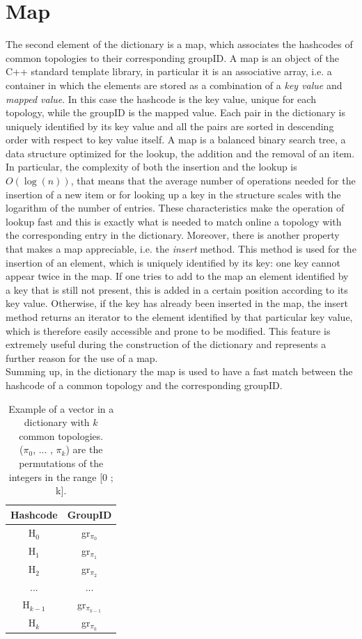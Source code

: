 \section{Map}
The second element of the dictionary is a map, which associates the hashcodes of common topologies to their corresponding groupID. A map is an object of the C++ standard template library, in particular it is an associative array, i.e. a container in which the elements are stored as a combination of a \textit{key value} and \textit{mapped value}. In this case the hashcode is the key value, unique for each topology, while the groupID is the mapped value. Each pair in the dictionary is uniquely identified by its key value and all the pairs are sorted in descending order with respect to key value itself. A map is a balanced binary search tree, a data structure optimized for the lookup, the addition and the removal of an item. In particular, the complexity of both the insertion and the lookup is $O(\log(n))$, that means that the average number of operations needed for the insertion of a new item or for looking up a key in the structure scales with the logarithm of the number of entries. These characteristics make the operation of lookup fast and this is exactly what is needed to match online a topology with the corresponding entry in the dictionary. Moreover, there is another property that makes a map appreciable, i.e. the \textit{insert} method. This method is used for the insertion of an element, which is uniquely identified by its key: one key cannot appear twice in the map. If one tries to add to the map an element identified by a key that is still not present, this is added in a certain position according to its key value. Otherwise, if the key has already been inserted in the map, the insert method returns an iterator to the element identified by that particular key value, which is therefore easily accessible and prone to be modified. This feature is extremely useful during the construction of the dictionary and represents a further reason for the use of a map.\\
Summing up, in the dictionary the map is used to have a fast match between the hashcode of a common topology and the corresponding groupID.
%
\begin{table}
\centering
\renewcommand\arraystretch{1.5}
 \begin{tabular}{|c|c|}
  \hline
  Hashcode & GroupID\\
  \hline
  H$_0$ & gr$_{\pi_{0}}$\\
  H$_1$ & gr$_{\pi_{1}}$\\
  H$_2$ & gr$_{\pi_{2}}$\\
  ... & ...\\
  H$_{k-1}$ & gr$_{\pi_{k-1}}$\\
  H$_k$ & gr$_{\pi_{k}}$\\
  \hline
 \end{tabular}
 \caption{Example of a vector in a dictionary with $k$ common topologies.\\ ($\pi_0$, ... , $\pi_k$) are the permutations of the integers in the range [0 ; k].}
 \label{tab:map}
\end{table}
%
